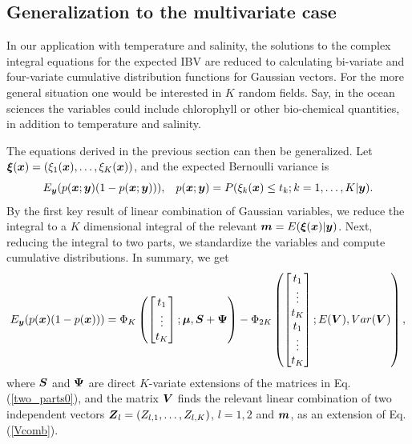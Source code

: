 \documentclass[aoas]{imsart}
\begin{document}
\subsection{Generalization to the multivariate case}

In our application with temperature and salinity, the solutions to the complex integral equations for the expected IBV are reduced to calculating bi-variate and four-variate cumulative distribution functions for Gaussian vectors. For the more general situation one would be interested in $K$ random fields. Say, in the ocean sciences the variables could include chlorophyll or other bio-chemical quantities, in addition to temperature and salinity. 

The equations derived in the previous section can then be generalized. Let ${\boldsymbol \xi}({\boldsymbol x})=(\xi_1({\boldsymbol x}),\ldots,\xi_K({\boldsymbol x}))$, and the expected Bernoulli variance is
\begin{equation}\label{two_partsK}
E_{\by}(p(\bx;\by)(1-p(\bx;\by))), \hspace{3mm} p(\bx;\by)=P(\xi_k(\bx) \leq t_k ; k=1,\ldots,K|\by). 
\end{equation}
By the first key result of linear combination of Gaussian variables, we reduce the integral to a $K$ dimensional integral of the relevant ${\boldsymbol m}=E({\boldsymbol \xi}({\boldsymbol x})|{\boldsymbol y})$. Next, reducing the integral to two parts, we standardize the variables and compute cumulative distributions. 
In summary, we get 
\begin{equation}\label{two_parts}
E_{\by}(p(\bx)(1-p(\bx))) =  \Phi_K 
\begin{pmatrix}
\begin{bmatrix} t_1\\
\vdots \\
t_K 
\end{bmatrix};
\bmu,\bS+\bPsi 
\end{pmatrix}
- \Phi_{2K} 
\begin{pmatrix}
\begin{bmatrix} t_1\\
\vdots \\
t_K \\
t_1\\
\vdots \\
t_K 
\end{bmatrix};
E(\bV),Var(\bV) 
\end{pmatrix},\nonumber
\end{equation}
where ${\boldsymbol S}$ and ${\boldsymbol \Psi}$ are direct $K$-variate extensions of the matrices in Eq. (\ref{two_parts0}), and the matrix ${\boldsymbol V}$ finds the relevant linear combination of two independent vectors ${\boldsymbol Z}_l=(Z_{l,1},\ldots,Z_{l,K})$, $l=1,2$ and ${\boldsymbol m}$, as an extension of Eq. (\ref{Vcomb}).
\end{document}
